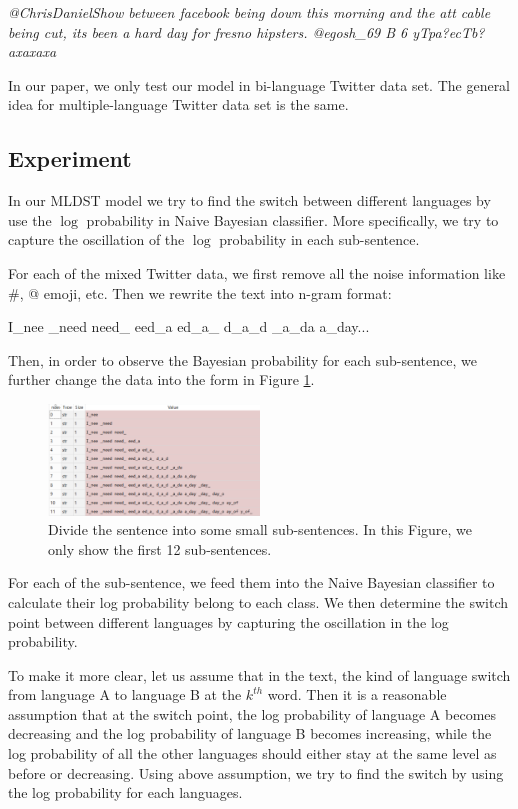 \documentclass[11pt]{article}
\begin{document}
\emph{@ChrisDanielShow between facebook being down this morning and the att cable being cut, its been a hard day for fresno hipsters. @egosh\_69 B 6 yTpa?ecTb?axaxaxa}

In our paper, we only test our model in bi-language Twitter data set. The general idea for multiple-language Twitter data set is the same. 


\subsection{Experiment}
In our MLDST model we try to find the switch between different languages by use the $\log$ probability in Naive Bayesian classifier. More specifically, we try to capture the oscillation of the $\log$ probability in each sub-sentence. 

For each of the mixed Twitter data, we first remove all the noise information like \#, @ emoji, etc. Then we rewrite the text into n-gram format:
\begin{center}
I\_nee \_need need\_ eed\_a ed\_a\_ d\_a\_d \_a\_da a\_day...
\end{center}
Then, in order to observe the Bayesian probability for each sub-sentence, we further change the data into the form in Figure \ref{subsentence}.
\begin{figure}
\includegraphics[width=0.5\textwidth]{subsentence.PNG}
\caption{Divide the sentence into some small sub-sentences. In this Figure, we only show the first 12 sub-sentences.}
\label{subsentence}
\end{figure}
For each of the sub-sentence, we feed them into the Naive Bayesian classifier to calculate their log probability belong to each class. We then determine the switch point between different languages by capturing the oscillation in the log probability. 

To make it more clear, let us assume that in the text, the kind of language switch from language A to language B at the $k^{th}$ word. Then it is a reasonable assumption that at the switch point, the log probability of language A becomes decreasing and the log probability of language B becomes increasing, while the log probability of all the other languages should either stay at the same level as before or decreasing. Using above assumption, we try to find the switch by using the log probability for each languages.
\end{document}
